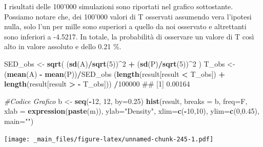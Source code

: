 \documentclass[a4paper,12pt,oneside]{book}
\newenvironment{Shaded}{\begin{snugshade}}{\end{snugshade}}
\newcommand{\KeywordTok}[1]{\textcolor[rgb]{0.13,0.29,0.53}{\textbf{#1}}}
\newcommand{\DataTypeTok}[1]{\textcolor[rgb]{0.13,0.29,0.53}{#1}}
\newcommand{\DecValTok}[1]{\textcolor[rgb]{0.00,0.00,0.81}{#1}}
\newcommand{\FloatTok}[1]{\textcolor[rgb]{0.00,0.00,0.81}{#1}}
\newcommand{\StringTok}[1]{\textcolor[rgb]{0.31,0.60,0.02}{#1}}
\newcommand{\CommentTok}[1]{\textcolor[rgb]{0.56,0.35,0.01}{\textit{#1}}}
\newcommand{\OperatorTok}[1]{\textcolor[rgb]{0.81,0.36,0.00}{\textbf{#1}}}
\newcommand{\NormalTok}[1]{#1}
\theoremstyle{definition}
\theoremstyle{definition}
\theoremstyle{definition}
\theoremstyle{remark}
\begin{document}
I risultati delle 100'000 simulazioni sono riportati nel grafico
sottostante. Possiamo notare che, dei 100'000 valori di T osservati
assumendo vera l'ipotesi nulla, solo l'un per mille sono superiori a
quello da noi osservato e altrettanti sono inferiori a -4.5217. In
totale, la probabilità di osservare un valore di T così alto in valore
assoluto e dello 0.21 \%.

\begin{Shaded}
\begin{Highlighting}[]
\NormalTok{SED_obs <-}\StringTok{ }\KeywordTok{sqrt}\NormalTok{( (}\KeywordTok{sd}\NormalTok{(A)}\OperatorTok{/}\KeywordTok{sqrt}\NormalTok{(}\DecValTok{5}\NormalTok{))}\OperatorTok{^}\DecValTok{2} \OperatorTok{+}
\StringTok{                   }\NormalTok{(}\KeywordTok{sd}\NormalTok{(P)}\OperatorTok{/}\KeywordTok{sqrt}\NormalTok{(}\DecValTok{5}\NormalTok{))}\OperatorTok{^}\DecValTok{2}\NormalTok{ )}
\NormalTok{T_obs <-}\StringTok{ }\NormalTok{(}\KeywordTok{mean}\NormalTok{(A) }\OperatorTok{-}\StringTok{ }\KeywordTok{mean}\NormalTok{(P))}\OperatorTok{/}\NormalTok{SED_obs}
\NormalTok{(}\KeywordTok{length}\NormalTok{(result[result }\OperatorTok{<}\StringTok{ }\NormalTok{T_obs]) }\OperatorTok{+}\StringTok{ }
\StringTok{    }\KeywordTok{length}\NormalTok{(result[result }\OperatorTok{>}\StringTok{ }\OperatorTok{-}\StringTok{ }\NormalTok{T_obs])) }\OperatorTok{/}\DecValTok{100000}
\NormalTok{## [1] 0.00164}
\end{Highlighting}
\end{Shaded}

\begin{Shaded}
\begin{Highlighting}[]
\CommentTok{#Codice Grafico }
\NormalTok{b <-}\StringTok{ }\KeywordTok{seq}\NormalTok{(}\OperatorTok{-}\DecValTok{12}\NormalTok{, }\DecValTok{12}\NormalTok{, }\DataTypeTok{by=}\FloatTok{0.25}\NormalTok{)}
\KeywordTok{hist}\NormalTok{(result, }\DataTypeTok{breaks =}\NormalTok{ b, }\DataTypeTok{freq=}\NormalTok{F, }\DataTypeTok{xlab =} \KeywordTok{expression}\NormalTok{(}\KeywordTok{paste}\NormalTok{(m)), }\DataTypeTok{ylab=}\StringTok{"Density"}\NormalTok{, }\DataTypeTok{xlim=}\KeywordTok{c}\NormalTok{(}\OperatorTok{-}\DecValTok{10}\NormalTok{,}\DecValTok{10}\NormalTok{), }\DataTypeTok{ylim=}\KeywordTok{c}\NormalTok{(}\DecValTok{0}\NormalTok{,}\FloatTok{0.45}\NormalTok{), }\DataTypeTok{main=}\StringTok{""}\NormalTok{)}
\end{Highlighting}
\end{Shaded}

\texttt{[image: \_main\_files/figure-latex/unnamed-chunk-245-1.pdf]}
\end{document}
